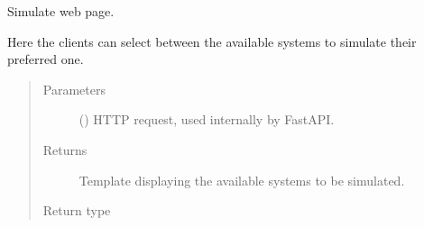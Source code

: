 \documentclass[a4paper,landscape,10pt,english]{sphinxmanual}
\begin{document}

\begin{fulllineitems}
\label{\detokenize{code_docs/simulation_API.controller:simulation_API.controller.main.simulate}}
Simulate web page.

Here the clients can select between the available systems to simulate their
preferred one.
\begin{quote}\begin{description}
\item[{Parameters}] \leavevmode
{} () \textendash{} HTTP request, used internally by FastAPI.

\item[{Returns}] \leavevmode
Template displaying the available systems to be simulated.

\item[{Return type}] \leavevmode
{}

\end{description}\end{quote}

\end{fulllineitems}

\end{document}
